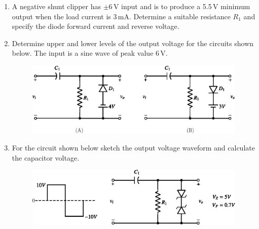 \begin{enumerate}
\item A negative shunt clipper has $\pm 6$\,V input and is to produce a 5.5\,V minimum output when the load current is 3\,mA. Determine a suitable resistance $R_{1}$ and specify the diode forward current and reverse voltage.


\item Determine upper and lower levels of the output voltage for the circuits shown below. The input is a sine wave of peak value 6\,V.
\begin{figure}[H]
\centering
\includegraphics{addfig/exr2.5.eps}
\end{figure}

\item For the circuit shown below sketch the output voltage waveform and calculate the capacitor voltage.
\begin{figure}[H]
\centering
\includegraphics{addfig/exr2.6.eps}
\end{figure}

\end{enumerate}
